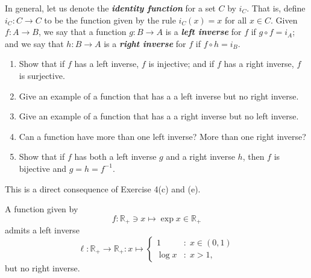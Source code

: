 \documentclass[a4paper,12pt]{article}
\begin{document}
\begin{exe}
	In general, let us denote the \textbf{\textit{identity function}}
	for a set \( C \) by \( i_C \).
	That is, define \( i_C:C\to C \) to be the function given by the rule
	\( i_C(x)=x \) for all \( x \in C \).
	Given \( f:A\to B \), we say that
	a function \( g:B \to A \) is a \textbf{\textit{left inverse}} for \( f \)
	if \( g \circ f = i_A \);
	and we say that \( h:B \to A \)  is a \textbf{\textit{right inverse}} for \( f \)
	if \( f \circ h = i_B \).
	\begin{enumerate}
		\item
		      Show that if \( f \) has a left inverse, \( f \) is injective;
		      and if \( f \) has a right inverse, \( f \) is surjective.
		      
		\item
		      Give an example of a function that has a a left inverse but no right inverse.
		      
		\item
		      Give an example of a function that has a a right inverse but no left inverse.
		      
		\item
		      Can a function have more than one left inverse? More than one right inverse?
		      
		\item
		      Show that if \( f \) has both a left inverse \( g \) and a right inverse \( h \),
		      then \( f \) is bijective and \( g=h=f ^{-1} \).
	\end{enumerate}
\end{exe}\begin{sol}\leavevmode \par
	This is a direct  consequence of Exercise 4(c) and (e).
	
	A function given by
	\begin{equation*}
		f:\mathbb{R}_{+} \ni x \mapsto \exp{x} \in \mathbb{R}_{+}
	\end{equation*}
	admits a left inverse
	\begin{equation*}
		\ell : \mathbb{R}_{+} \to \mathbb{R}_{+} :
		x \mapsto 	\begin{cases}
			1      & \mathrm{\colon\;} x \in (0,1) \\
			\log x & \mathrm{\colon\;} x > 1,
		\end{cases}
	\end{equation*}
	but no right inverse.
	

\end{sol}
\end{document}
